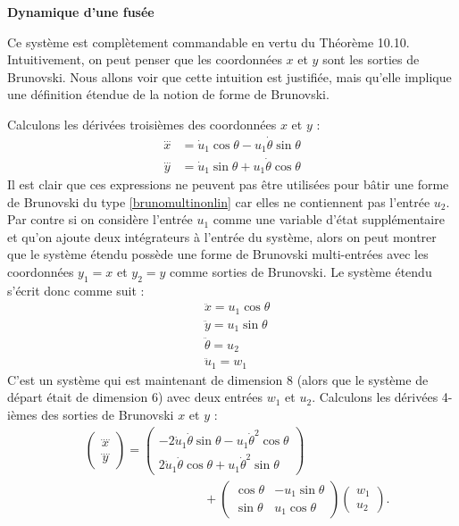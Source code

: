 \begin{theoreme}
\begin{exemple}{\bf Dynamique d'une fusée}
\end{exemple}
Ce système est complètement commandable en vertu du Théorème 10.10. Intuitivement, on peut penser que les coordonnées $x$ et $y$ sont les sorties de Brunovski. Nous allons voir que cette intuition est justifiée, mais qu'elle implique une définition étendue de la notion de forme de Brunovski.

Calculons les dérivées troisièmes des coordonnées $x$ et $y$ :
\begin{align*}
\stackrel{\dots}{x} &= \dot u_1 \cos \theta - u_1 \dot \theta \sin \theta \\
\stackrel{\dots}{y} &= \dot u_1 \sin \theta + u_1 \dot \theta \cos \theta
\end{align*}
Il est clair que ces expressions ne peuvent pas être utilisées pour bâtir une forme de Brunovski du type \eqref{brunomultinonlin} car elles ne contiennent pas l'entrée $u_2$. Par contre si on considère l'entrée $u_1$ comme une variable d'état supplémentaire et qu'on ajoute deux intégrateurs à l'entrée du système, alors on peut montrer que le système étendu possède une forme de Brunovski multi-entrées avec les coordonnées $y_1 = x$ et $y_2 = y$ comme sorties de Brunovski. Le système étendu s'écrit donc comme suit :
\begin{align} \label{etendufusee}
&\ddot x = u_1 \cos \theta \nonumber \\
&\ddot y = u_1 \sin \theta \nonumber \\
&\ddot \theta = u_2 \\
&\ddot u_1 = w_1 \nonumber
\end{align}
C'est un système qui est maintenant de dimension 8 (alors que le système de départ était de dimension 6) avec deux entrées $w_1$ et $u_2$. Calculons les dérivées 4-ièmes des sorties de Brunovski $x$ et $y$ :
\begin{align}
&\left(\begin{array}{c}\stackrel{....}{x} \\ \stackrel{....}{y} \end{array}\right) = \left(\begin{array}{c}-2\dot u_1 \dot \theta \sin \theta - u_1 \dot \theta^2 \cos \theta 
 \\ 2\dot u_1 \dot \theta \cos \theta + u_1 \dot \theta^2 \sin \theta\end{array}\right) \nonumber \\
&\hspace{4cm} + \left(\begin{array}{cc}\cos \theta & -u_1 \sin \theta \\\sin \theta & u_1 \cos \theta\end{array}\right)\left(\begin{array}{c}w_1 \\u_2\end{array}\right). \label{brunofusee}

\end{align}
\end{theoreme}
